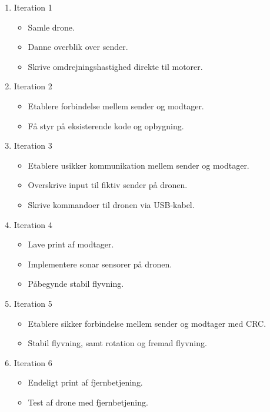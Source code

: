 \documentclass[Main]{subfiles}
\begin{document}
\begin{enumerate}
\item[] Iteration 1
	\vspace{-10pt}
	\begin{itemize}
	\item Samle drone.
	\item Danne overblik over sender.
	\item Skrive omdrejningshastighed direkte til motorer.
	\end{itemize}
	
\item[] Iteration 2
	\vspace{-10pt}
	\begin{itemize}
	\item Etablere forbindelse mellem sender og modtager.
	\item Få styr på eksisterende kode og opbygning.
	\end{itemize}
	
\item[] Iteration 3
	\vspace{-10pt}
	\begin{itemize}
	\item Etablere usikker kommunikation mellem sender og modtager.
	\item Overskrive input til fiktiv sender på dronen.
	\item Skrive kommandoer til dronen via USB-kabel.
	\end{itemize}

\item[] Iteration 4
	\vspace{-10pt}
	\begin{itemize}
	\item Lave print af modtager.
	\item Implementere sonar sensorer på dronen.
	\item Påbegynde stabil flyvning.
	\end{itemize}
	
\item[] Iteration 5
	\vspace{-10pt}
	\begin{itemize}
	\item Etablere sikker forbindelse mellem sender og modtager med CRC.
	\item Stabil flyvning, samt rotation og fremad flyvning.
	\end{itemize}
	
\item[] Iteration 6
	\vspace{-10pt}
	\begin{itemize}
	\item Endeligt print af fjernbetjening.
	\item Test af drone med fjernbetjening.
	\end{itemize}

\end{enumerate}
\end{document}
